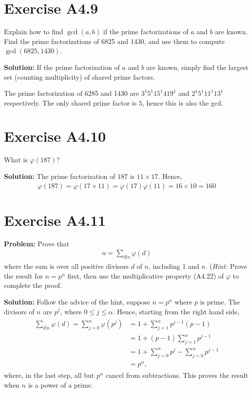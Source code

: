 \documentclass{book}
\begin{document}
\section*{Exercise A4.9}
    Explain how to find $\gcd(a,b)$ if the prime factorizations of $a$ and $b$ are known. Find the prime factorizations of 6825 and 1430, and use them to compute $\gcd(6825,1430)$.
    
    \textbf{Solution:} If the prime factorization of $a$ and $b$ are known, simply find the largest set (counting multiplicity) of shared prime factors. 

    The prime factorization of 6285 and 1430 are $3^1 5^1 15^1 419^1$ and $2^1 5^1 11^1 13^1$ respectively. The only shared prime factor is $5$, hence this is also the gcd.

\section*{Exercise A4.10}
    What is $\varphi(187)$?
    
    \textbf{Solution:} The prime factorization of $187$ is $11\times17$. Hence,
    \begin{align}
        \varphi(187) = \varphi(17\times 11) = \varphi(17)\varphi(11) = 16 \times 10 = 160
    \end{align}

\section*{Exercise A4.11}
    \textbf{Problem:} Prove that
    \begin{align}
        n = \sum_{d|n} \varphi(d)
    \end{align}
    where the sum is over all positive divisors $d$ of $n$, including 1 and $n$. (\emph{Hint:} Prove the result for $n=p^\alpha$ first, then use the multiplicative property (A4.22) of $\varphi$ to complete the proof.

    \textbf{Solution:} Follow the advice of the hint, suppose $n=p^\alpha$ where $p$ is prime. The divisors of $n$ are $p^j$, where $0\leq j \leq \alpha$. Hence, starting from the right hand side,
    \begin{align}
    \begin{aligned}
        \sum_{d|n} \varphi(d) = \sum_{j=0}^\alpha \varphi(p^j) &=1 +  \sum_{j=1}^\alpha p^{j-1}(p-1)\\
        &= 1+ (p-1)\sum_{j=1}^\alpha p^{j-1} \\
        &= 1 + \sum_{j=0}^\alpha p^j -\sum_{j=0}^\alpha p^{j-1} \\
        &= p^\alpha,
    \end{aligned}
    \end{align}
    where, in the last step, all but $p^\alpha$ cancel from subtractions. This proves the result when $n$ is a power of a prime.
    
\end{document}
